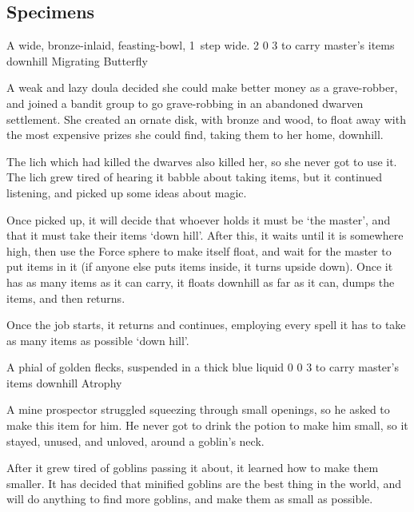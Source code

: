 \begin{multicols}{2}
\subsection{Specimens}

  {A wide, bronze-inlaid, feasting-bowl, 1~\gls{step} wide.}%
  {2}%
  {0}%
  {3}%
  {to carry master's items downhill}%
  {Migrating Butterfly}%
  {
    \setcounter{Fire}{2}
    \setcounter{Earth}{2}
    \setcounter{Water}{2}
    \setcounter{Vigilance}{2}
  }%

A weak and lazy \gls{doula} decided she could make better money as a grave-robber, and joined a bandit group to go grave-robbing in an abandoned dwarven settlement.
She created an ornate disk, with bronze and wood, to float away with the most expensive prizes she could find, taking them to her home, downhill.

The lich which had killed the dwarves also killed her, so she never got to use it.
The lich grew tired of hearing it babble about taking items, but it continued listening, and picked up some ideas about magic.

Once picked up, it will decide that whoever holds it must be `the master', and that it must take their items `down hill'.
After this, it waits until it is somewhere high, then use the Force sphere to make itself float, and wait for the master to put items in it (if anyone else puts items inside, it turns upside down).
Once it has as many items as it can carry, it floats downhill as far as it can, dumps the items, and then returns.

Once the job starts, it returns and continues, employing every spell it has to take as many items as possible `down hill'.

\showStdSpells

  {A phial of golden flecks, suspended in a thick blue liquid}%
  {0}%
  {0}%
  {3}%
  {to carry master's items downhill}%
  {Atrophy}%
  {
    \setcounter{Earth}{2}
    \setcounter{Water}{2}
    \setcounter{Caving}{3}
  }%

A mine prospector struggled squeezing through small openings, so he asked  to make this item for him.
He never got to drink the potion to make him small, so it stayed, unused, and unloved, around a goblin's neck.

After it grew tired of goblins passing it about, it learned how to make them smaller.
It has decided that minified goblins are the best thing in the world, and will do anything to find more goblins, and make them as small as possible.


\end{multicols}
